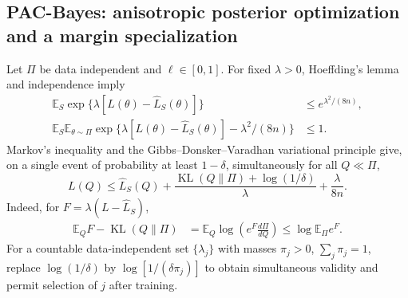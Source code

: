 \subsection{PAC-Bayes: anisotropic posterior optimization and a margin specialization}
\label{app:pacbayes-derivations}
Let $\Pi$ be data independent and $\ell\in[0,1]$. For fixed $\lambda>0$,
Hoeffding's lemma and independence imply
\begin{align}
 \mathbb E_S\exp\{\lambda[L(\theta)-\widehat L_S(\theta)]\}
 &\le e^{\lambda^2/(8n)},\\
 \mathbb E_S\mathbb E_{\theta\sim\Pi}
 \exp\{\lambda[L(\theta)-\widehat L_S(\theta)]-\lambda^2/(8n)\}
 &\le1.\label{eq:pb-mgf-explicit}
\end{align}
Markov's inequality and the Gibbs--Donsker--Varadhan variational principle
\cite{donsker1975asymptotic} give,
on a single event of probability at least $1-\delta$, simultaneously for
all $Q\ll\Pi$,
\begin{equation}
 L(Q)\le\widehat L_S(Q)+
 \frac{\operatorname{KL}(Q\|\Pi)+\log(1/\delta)}{\lambda}
                     +\frac{\lambda}{8n}.\label{eq:pb-uniform-Q}
\end{equation}
Indeed, for $F=\lambda(L-\widehat L_S)$,
\begin{align}
 \mathbb E_QF-\operatorname{KL}(Q\|\Pi)
 &=\mathbb E_Q\log\left(e^F\frac{d\Pi}{dQ}\right)
 \le\log\mathbb E_\Pi e^F.
\end{align}
For a countable data-independent set $\{\lambda_j\}$ with masses
$\pi_j>0$, $\sum_j\pi_j=1$, replace $\log(1/\delta)$ by
$\log[1/(\delta\pi_j)]$ to obtain simultaneous validity and permit
selection of $j$ after training.

